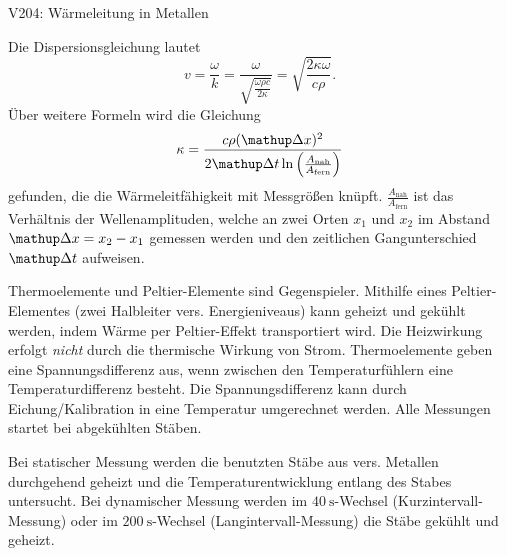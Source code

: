 \begin{Versuch}{V204: Wärmeleitung in Metallen}
\begin{Theorie}
			Die Dispersionsgleichung lautet
			\begin{equation}
				\label{dispersion}
				v=\frac{\omega}{k}=\frac{\omega}{\sqrt{\frac{\omega\rho c}{2\kappa}}}=\sqrt{\frac{2\kappa\omega}{c\rho}}.
			\end{equation}
			Über weitere Formeln wird die Gleichung
			\begin{equation}
				\label{waermeleitfaehigkeit}
				\kappa=\frac{c\rho(\upD{x})^2}{2\upD{t}\ln\left({\frac{A_\text{nah}}{A_\text{fern}}}\right)}
			\end{equation}
			gefunden, die die Wärmeleitfähigkeit mit Messgrößen knüpft.
			$\frac{A_\text{nah}}{A_\text{fern}}$ ist das Verhältnis der Wellenamplituden, welche an zwei Orten $x_1$ und $x_2$ im Abstand
			$\upD{x}=x_2-x_1$ gemessen werden und den zeitlichen Gangunterschied $\upD{t}$ aufweisen. 
        \end{Theorie}
        
        \begin{Durchführung}
            Thermoelemente und Peltier-Elemente sind Gegenspieler.
            Mithilfe eines Peltier-Elementes 
            (zwei Halbleiter vers. Energieniveaus)
            kann geheizt und gekühlt werden, 
            indem Wärme per Peltier-Effekt transportiert wird.
            Die Heizwirkung erfolgt \emph{nicht} durch die thermische Wirkung von Strom.
            Thermoelemente geben eine Spannungsdifferenz aus, 
            wenn zwischen den Temperaturfühlern eine Temperaturdifferenz besteht.
            Die Spannungsdifferenz kann durch Eichung/Kalibration in eine Temperatur umgerechnet werden.
            Alle Messungen startet bei abgekühlten Stäben.

            Bei statischer Messung werden die benutzten Stäbe aus vers. Metallen durchgehend geheizt und die Temperaturentwicklung entlang des Stabes untersucht.
            Bei dynamischer Messung werden im 
            $\SI{40}{\second}$-Wechsel (Kurzintervall-Messung) oder im
            $\SI{200}{\second}$-Wechsel (Langintervall-Messung) 
            die Stäbe gekühlt und geheizt.
        \end{Durchführung}        
       

\end{Versuch}

